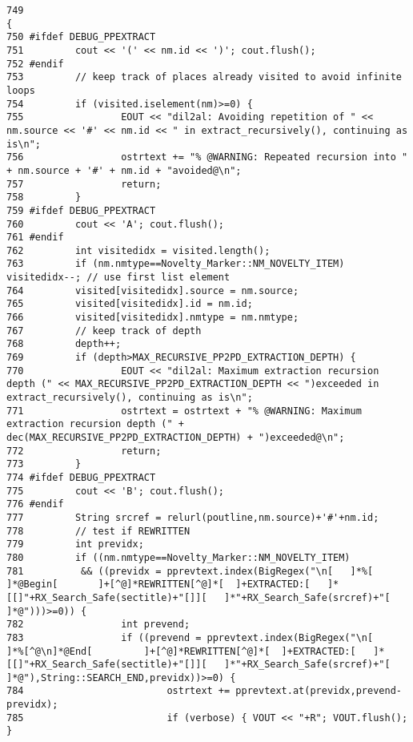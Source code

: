 \footnotesize\begin{verbatim}749                                                                                                                                                                                                                                                                 {
750 #ifdef DEBUG_PPEXTRACT
751         cout << '(' << nm.id << ')'; cout.flush();
752 #endif
753         // keep track of places already visited to avoid infinite loops
754         if (visited.iselement(nm)>=0) {
755                 EOUT << "dil2al: Avoiding repetition of " << nm.source << '#' << nm.id << " in extract_recursively(), continuing as is\n";
756                 ostrtext += "% @WARNING: Repeated recursion into " + nm.source + '#' + nm.id + "avoided@\n";
757                 return;
758         }
759 #ifdef DEBUG_PPEXTRACT
760         cout << 'A'; cout.flush();
761 #endif
762         int visitedidx = visited.length();
763         if (nm.nmtype==Novelty_Marker::NM_NOVELTY_ITEM) visitedidx--; // use first list element
764         visited[visitedidx].source = nm.source;
765         visited[visitedidx].id = nm.id;
766         visited[visitedidx].nmtype = nm.nmtype;
767         // keep track of depth
768         depth++;
769         if (depth>MAX_RECURSIVE_PP2PD_EXTRACTION_DEPTH) {
770                 EOUT << "dil2al: Maximum extraction recursion depth (" << MAX_RECURSIVE_PP2PD_EXTRACTION_DEPTH << ")exceeded in extract_recursively(), continuing as is\n";
771                 ostrtext = ostrtext + "% @WARNING: Maximum extraction recursion depth (" + dec(MAX_RECURSIVE_PP2PD_EXTRACTION_DEPTH) + ")exceeded@\n";
772                 return;
773         }
774 #ifdef DEBUG_PPEXTRACT
775         cout << 'B'; cout.flush();
776 #endif
777         String srcref = relurl(poutline,nm.source)+'#'+nm.id;
778         // test if REWRITTEN
779         int previdx;
780         if ((nm.nmtype==Novelty_Marker::NM_NOVELTY_ITEM)
781          && ((previdx = pprevtext.index(BigRegex("\n[   ]*%[    ]*@Begin[       ]+[^@]*REWRITTEN[^@]*[  ]+EXTRACTED:[   ]*[[]"+RX_Search_Safe(sectitle)+"[]][   ]*"+RX_Search_Safe(srcref)+"[   ]*@")))>=0)) {
782                 int prevend;
783                 if ((prevend = pprevtext.index(BigRegex("\n[    ]*%[^@\n]*@End[         ]+[^@]*REWRITTEN[^@]*[  ]+EXTRACTED:[   ]*[[]"+RX_Search_Safe(sectitle)+"[]][   ]*"+RX_Search_Safe(srcref)+"[   ]*@"),String::SEARCH_END,previdx))>=0) {
784                         ostrtext += pprevtext.at(previdx,prevend-previdx);
785                         if (verbose) { VOUT << "+R"; VOUT.flush(); }

\end{verbatim}
